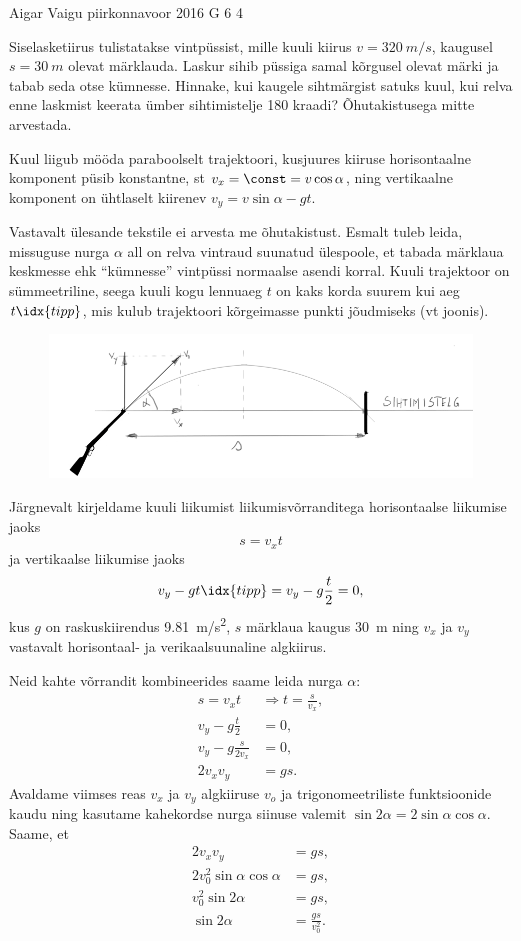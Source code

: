 {Aigar Vaigu} %
{piirkonnavoor} %
{2016} %
{G 6} %
{4} %
{
\ifStatement
Siselasketiirus tulistatakse vintpüssist, mille kuuli kiirus $v=\SI{320}{m/s}$, kaugusel $s=\SI{30}{m}$ olevat märklauda. Laskur sihib püssiga samal kõrgusel olevat märki ja tabab seda otse kümnesse. Hinnake, kui kaugele sihtmärgist satuks kuul, kui relva enne laskmist keerata ümber sihtimistelje 180 kraadi? Õhutakistusega mitte arvestada.
\fi


\ifHint
Kuul liigub mööda paraboolselt trajektoori, kusjuures kiiruse horisontaalne komponent püsib konstantne, st $v_x = \const = v\cos\alpha$, ning vertikaalne komponent on ühtlaselt kiirenev $v_y = v\sin\alpha - gt$.
\fi


\ifSolution
Vastavalt ülesande tekstile ei arvesta me õhutakistust.
Esmalt tuleb leida, missuguse nurga $\alpha$ all on relva vintraud suunatud ülespoole, et tabada märklaua keskmesse ehk \enquote{kümnesse} vintpüssi normaalse asendi korral. Kuuli trajektoor on sümmeetriline, seega kuuli kogu lennuaeg $t$ on kaks korda suurem kui aeg $t\idx{tipp}$, mis kulub trajektoori kõrgeimasse punkti jõudmiseks (vt joonis).
\begin{figure}[h!]
	\centering
	\includegraphics[scale=0.55]{2016-v2g-06-Lasketiir-1.PNG}
\end{figure}

Järgnevalt kirjeldame kuuli liikumist liikumisvõrranditega horisontaalse liikumise jaoks
$$
s=v_{x}t
$$
ja vertikaalse liikumise jaoks
$$
v_{y}-gt\idx{tipp}=v_{y}-g\frac{t}{2}=0,
$$
kus $g$ on raskuskiirendus \SI{9,81}{m/s^2}, $s$ märklaua kaugus \SI{30}{m} ning $v_x$ ja $v_y$ vastavalt horisontaal- ja verikaalsuunaline algkiirus.

Neid kahte võrrandit kombineerides saame leida nurga $\alpha$:
\begin{align*}
s=v_{x}t & \Rightarrow t=\frac{s}{v_{x}},\\
v_{y}-g\frac{t}{2} & = 0,\\
v_{y}-g\frac{s}{2v_{x}} & = 0,\\
2v_{x}v_{y} & = gs.
\end{align*}
Avaldame viimses reas $v_x$ ja $v_y$ algkiiruse $v_o$ ja trigonomeetriliste funktsioonide kaudu ning kasutame kahekordse nurga siinuse valemit 
$\sin2\alpha = 2\sin\alpha\cos\alpha$. Saame, et 
\begin{align*}
2v_{x}v_{y} & = gs,\\
2v_{0}^{2}\sin\alpha\cos\alpha & = gs,\\
v_{0}^{2}\sin2\alpha & = gs,\\
\sin2\alpha & = \frac{gs}{v_{0}^{2}}.
\end{align*}

}
